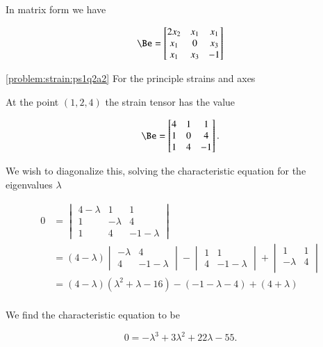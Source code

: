 \begin{Answer}[ref={problem:strain:ps1q2a}]
In matrix form we have

\begin{equation}\label{eqn:continuumProblemSet1:250}
\Be =
\begin{bmatrix}
2 x_2 & x_1 & x_1 \\
x_1 & 0 & x_3 \\
x_1 & x_3 & -1 \\
\end{bmatrix}
\end{equation}

\ref{problem:strain:ps1q2a2} For the principle strains and axes

At the point $(1, 2, 4)$ the strain tensor has the value

\begin{equation}\label{eqn:continuumProblemSet1:270}
\Be =
\begin{bmatrix}
4 & 1 & 1 \\
1 & 0 & 4 \\
1 & 4 & -1
\end{bmatrix}.
\end{equation}

We wish to diagonalize this, solving the characteristic equation for the eigenvalues $\lambda$

\begin{align*}
0 &=
\begin{vmatrix}
4 -\lambda & 1 & 1 \\
1 & -\lambda & 4 \\
1 & 4 & -1 -\lambda
\end{vmatrix} \\
&=
(4 -\lambda )
\begin{vmatrix}
 -\lambda & 4 \\
 4 & -1 -\lambda
\end{vmatrix}
-
\begin{vmatrix}
1 & 1 \\
4 & -1 -\lambda
\end{vmatrix}
+
\begin{vmatrix}
1 & 1 \\
-\lambda & 4 \\
\end{vmatrix} \\
&=
(4 - \lambda)(\lambda^2 + \lambda - 16)
-(-1 -\lambda - 4)
+(4 + \lambda) \\
\end{align*}

We find the characteristic equation to be

\begin{equation}\label{eqn:continuumProblemSet1:290}
0 = -\lambda^3 + 3 \lambda^2 + 22\lambda - 55.
\end{equation}


\end{Answer}
